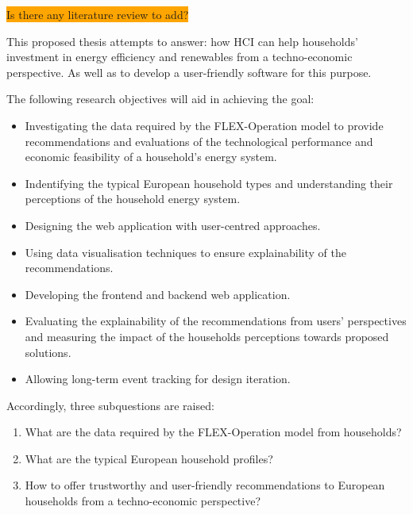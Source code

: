 \colorbox{orange}{Is there any literature review to add?}

This proposed thesis attempts to answer:  
how HCI can help households' investment in energy efficiency and renewables
from a techno-economic perspective.
As well as to develop a user-friendly software for this purpose. 

The following research objectives will aid in achieving the goal: 

\begin{itemize}
  \item Investigating the data required by the FLEX-Operation model to provide recommendations and evaluations of the technological performance and economic feasibility of a household's energy system. 
  \item Indentifying the typical European household types and understanding their perceptions of the household energy system. 
  \item Designing the web application with user-centred approaches. 
  \item Using data visualisation techniques to ensure explainability of the recommendations. 
  \item Developing the frontend and backend web application. 
  \item Evaluating the explainability of the recommendations from users' perspectives and measuring the impact of the households perceptions towards proposed solutions. 
  \item Allowing long-term event tracking for design iteration. 
\end{itemize}



Accordingly, three subquestions are raised: 

\begin{enumerate}
  \item What are the data required by the FLEX-Operation model from households? 
  \item What are the typical European household profiles? 
  \item How to offer trustworthy and user-friendly recommendations to European households from a techno-economic perspective? 
\end{enumerate}




